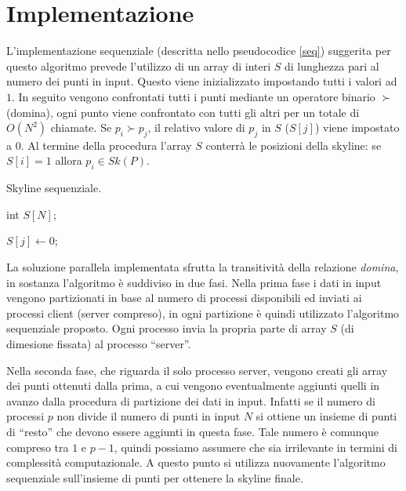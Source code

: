 \documentclass[a4paper, 11pt]{article}
\theoremstyle{definition}
\theoremstyle{remark}
\begin{document}
\section{Implementazione}
L'implementazione sequenziale (descritta nello pseudocodice \ref{seq})
suggerita per questo algoritmo prevede l'utilizzo
di un array di interi $S$ di lunghezza pari al numero dei punti in input.
Questo viene inizializzato impostando tutti i valori ad $1$. In seguito
vengono confrontati tutti i punti mediante un operatore binario $\succ$
(domina), ogni
punto viene confrontato con tutti gli altri per un totale di $O(N^2)$ chiamate.
Se $p_i \succ p_j$, il relativo valore di $p_j$ in $S$ ($S[j]$) viene impostato
a $0$.
Al termine della procedura l'array $S$ conterrà le posizioni della skyline:
se $S[i] = 1$ allora $p_i \in Sk(P)$.

\begin{algorithm}
\caption{Skyline sequenziale.}
\label{seq}
\begin{algorithmic}
\State int $S[N]$;
\EndFor

         \State $S[j] \gets 0$;
      \EndIf
   \EndFor
\EndFor
\EndFunction
\end{algorithmic}
\end{algorithm}

La soluzione parallela implementata sfrutta la transitività della relazione
\emph{domina}, in sostanza l'algoritmo è suddiviso in due fasi. Nella
prima fase i dati in input vengono partizionati in base al numero di processi
disponibili ed inviati ai processi client (server compreso),
in ogni partizione è quindi utilizzato l'algoritmo sequenziale proposto.
Ogni processo invia la propria parte di array $S$  (di dimesione fissata)
al processo ``server''.

Nella seconda fase, che riguarda il solo processo server,
vengono creati gli array dei punti ottenuti dalla prima,
a cui vengono eventualmente aggiunti quelli in avanzo dalla procedura di
partizione dei dati in input. Infatti se il numero di processi $p$ non divide
il numero di punti in input $N$ si ottiene un insieme di punti di ``resto'' che
devono essere aggiunti in questa fase. Tale numero è comunque compreso tra $1$
e $p-1$, quindi possiamo assumere che sia irrilevante in termini di complessità
computazionale. A questo punto si utilizza nuovamente l'algoritmo sequenziale
sull'insieme di punti per ottenere la skyline finale.
\end{document}
